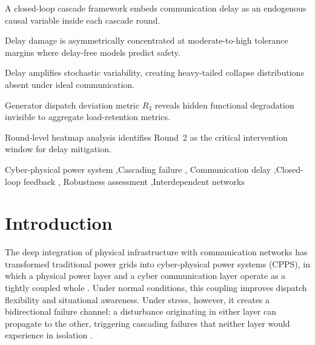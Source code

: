 \documentclass[a4paper,fleqn]{cas-dc}
\begin{document}
\begin{highlights}
\item A closed-loop cascade framework embeds communication delay as an
  endogenous causal variable inside each cascade round.
\item Delay damage is asymmetrically concentrated at moderate-to-high
  tolerance margins where delay-free models predict safety.
\item Delay amplifies stochastic variability, creating heavy-tailed
  collapse distributions absent under ideal communication.
\item Generator dispatch deviation metric $R_3$ reveals hidden
  functional degradation invisible to aggregate load-retention metrics.
\item Round-level heatmap analysis identifies Round~2 as the critical
  intervention window for delay mitigation.
\end{highlights}

\begin{keywords}
Cyber-physical power system \sep Cascading failure \sep
Communication delay \sep Closed-loop feedback \sep
Robustness assessment \sep Interdependent networks
\end{keywords}

\maketitle

\section{Introduction}\label{sec:intro}

The deep integration of physical infrastructure with communication
networks has transformed traditional power grids into cyber-physical
power systems (CPPS), in which a physical power layer and a cyber
communication layer operate as a tightly coupled whole
\citep{Rinaldi2001,Ouyang2014}.  Under normal conditions, this coupling
improves dispatch flexibility and situational awareness.  Under stress,
however, it creates a bidirectional failure channel: a disturbance
originating in either layer can propagate to the other, triggering
cascading failures that neither layer would experience in isolation
\citep{Buldyrev2010,Gao2012}.
\end{document}
